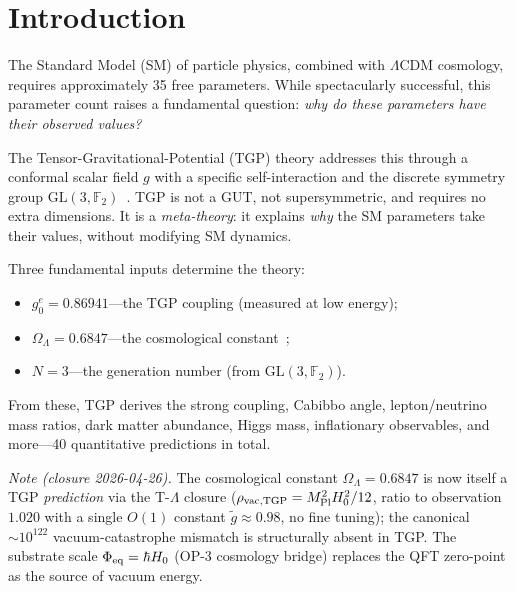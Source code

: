 \documentclass[aps,prl,twocolumn,superscriptaddress,showpacs,floatfix]{revtex4-2}
\newcommand{\gone}{{g_0^e}}
\newcommand{\OL}{\Omega_\Lambda}
\newcommand{\GL}{\mathrm{GL}(3,\mathbb{F}_2)}
\begin{document}
\maketitle

\section{Introduction}

The Standard Model (SM) of particle physics, combined with $\Lambda$CDM
cosmology, requires approximately 35 free parameters.
While spectacularly successful, this parameter count raises a fundamental
question: \emph{why do these parameters have their observed values?}

The Tensor-Gravitational-Potential (TGP) theory addresses this through
a conformal scalar field $g$ with a specific self-interaction and the
discrete symmetry group $\GL$~\cite{GL3F2}.
TGP is not a GUT, not supersymmetric, and requires no extra dimensions.
It is a \emph{meta-theory}: it explains \emph{why} the SM parameters
take their values, without modifying SM dynamics.

Three fundamental inputs determine the theory:
\begin{itemize}
\item $\gone = 0.86941$---the TGP coupling (measured at low energy);
\item $\OL = 0.6847$---the cosmological constant~\cite{Planck2018};
\item $N = 3$---the generation number (from $\GL$).
\end{itemize}
From these, TGP derives the strong coupling, Cabibbo angle,
lepton/neutrino mass ratios, dark matter abundance, Higgs mass,
inflationary observables, and more---40 quantitative predictions in total.

\emph{Note (closure 2026-04-26).} The cosmological constant $\OL = 0.6847$
is now itself a TGP \emph{prediction} via the T-$\Lambda$ closure
($\rho_{\rm vac,TGP} = M_{\rm Pl}^2 H_0^2/12$, ratio to observation
$1.020$ with a single $O(1)$ constant $\tilde g \approx 0.98$, no fine
tuning); the canonical $\sim 10^{122}$ vacuum-catastrophe mismatch is
structurally absent in TGP. The substrate scale $\Phi_{\rm eq} = \hbar H_0$
(OP-3 cosmology bridge) replaces the QFT zero-point as the source of
vacuum energy.


\end{document}
